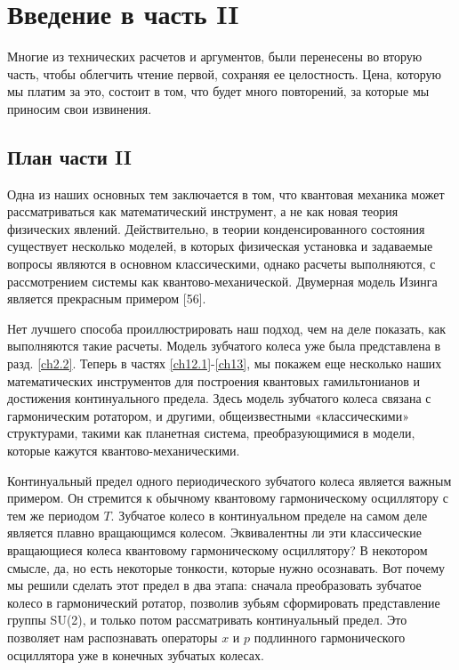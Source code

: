 \documentclass[main.tex]{subfiles}
\begin{document}
\section{Введение в часть II}\label{ch11}

Многие из технических расчетов и аргументов, были перенесены во вторую часть, чтобы облегчить чтение первой, сохраняя ее целостность. Цена, которую мы платим за это, состоит в том, что будет много повторений, за которые мы приносим свои извинения.

\subsection{План части II}\label{ch11.1}

Одна из наших основных тем заключается в том, что квантовая механика может рассматриваться как математический инструмент, а не как новая теория физических явлений. Действительно, в теории конденсированного состояния существует несколько моделей, в которых физическая установка и задаваемые вопросы являются в основном классическими, однако расчеты выполняются, с рассмотрением системы как квантово-механической. Двумерная модель Изинга является прекрасным примером [56].

Нет лучшего способа проиллюстрировать наш подход, чем на деле показать, как выполняются такие расчеты. Модель зубчатого колеса уже была представлена в разд. \ref{ch2.2}. Теперь в частях \ref{ch12.1}-\ref{ch13}, мы покажем еще несколько наших математических инструментов для построения квантовых гамильтонианов и достижения континуального предела. Здесь модель зубчатого колеса связана с гармоническим ротатором, и другими, общеизвестными «классическими» структурами, такими как планетная система, преобразующимися в модели, которые кажутся квантово-механическими.

Континуальный предел одного периодического зубчатого колеса является важным примером. Он стремится к обычному квантовому гармоническому осциллятору с тем же периодом $T$. Зубчатое колесо в континуальном пределе на самом деле является плавно вращающимся колесом. Эквивалентны ли эти классические вращающиеся колеса квантовому гармоническому осциллятору? В некотором смысле, да, но есть некоторые тонкости, которые нужно осознавать. Вот почему мы решили сделать этот предел в два этапа: сначала преобразовать зубчатое колесо в гармонический ротатор, позволив зубьям сформировать представление группы SU(2), и только потом рассматривать континуальный предел. Это позволяет нам распознавать операторы $x$ и $p$ подлинного гармонического осциллятора уже в конечных зубчатых колесах.
\end{document}
